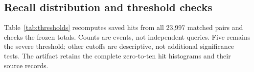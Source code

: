 \subsection{Recall distribution and threshold checks}\label{app:thresholds}

Table~\ref{tab:thresholds} recomputes saved hits from all 23,997 matched
pairs and checks the frozen totals. Counts are events, not independent
queries. Five remains the severe threshold; other cutoffs are descriptive,
not additional significance tests. The artifact retains the complete
zero-to-ten hit histograms and their source records.
